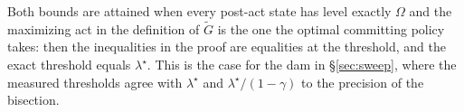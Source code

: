 \begin{remark}
Both bounds are attained when every post-act state has level exactly $\Omega$ and the maximizing act in the definition of $\tilde G$ is the one the optimal committing policy takes: then the inequalities in the proof are equalities at the threshold, and the exact threshold equals $\lambda^\star$.
This is the case for the dam in \S\ref{sec:sweep}, where the measured thresholds agree with $\lambda^\star$ and $\lambda^\star/(1-\gamma)$ to the precision of the bisection.
\end{remark}
